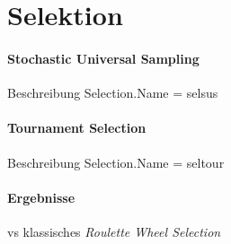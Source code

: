 \section{Selektion}\label{selection}


\paragraph{Stochastic Universal Sampling}
Beschreibung
Selection.Name = selsus

\paragraph{Tournament Selection}
Beschreibung
Selection.Name = seltour

\paragraph{Ergebnisse}
vs klassisches \emph{Roulette Wheel Selection}

